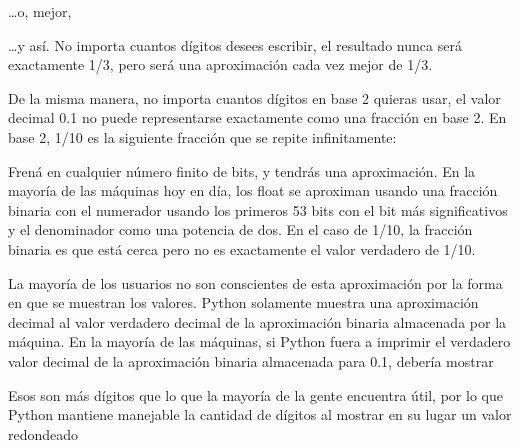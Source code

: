 \documentclass[a4,10pt,spanish]{sphinxmanual}
\begin{document}
\sphinxAtStartPar
…o, mejor,

\begin{sphinxVerbatim}[commandchars=\\\{\}]
\end{sphinxVerbatim}

\sphinxAtStartPar
…y así.  No importa cuantos dígitos desees escribir, el resultado nunca será exactamente 1/3, pero será una aproximación cada vez mejor de 1/3.

\sphinxAtStartPar
De la misma manera, no importa cuantos dígitos en base 2 quieras usar, el valor decimal 0.1 no puede representarse exactamente como una fracción en base 2.  En base 2, 1/10 es la siguiente fracción que se repite infinitamente:

\begin{sphinxVerbatim}[commandchars=\\\{\}]
\end{sphinxVerbatim}

\sphinxAtStartPar
Frená en cualquier número finito de bits, y tendrás una aproximación.  En la mayoría de las máquinas hoy en día, los float se aproximan usando una fracción binaria con el numerador usando los primeros 53 bits con el bit más significativos y el denominador como una potencia de dos.  En el caso de 1/10, la fracción binaria es  que está cerca pero no es exactamente el valor verdadero de 1/10.

\sphinxAtStartPar
La mayoría de los usuarios no son conscientes de esta aproximación por la forma en que se muestran los valores.  Python solamente muestra una aproximación decimal al valor verdadero decimal de la aproximación binaria almacenada por la máquina.  En la mayoría de las máquinas, si Python fuera a imprimir el verdadero valor decimal de la aproximación binaria almacenada para 0.1, debería mostrar

\begin{sphinxVerbatim}[commandchars=\\\{\}]
\end{sphinxVerbatim}

\sphinxAtStartPar
Esos son más dígitos que lo que la mayoría de la gente encuentra útil, por lo que Python mantiene manejable la cantidad de dígitos al mostrar en su lugar un valor redondeado
\end{document}
